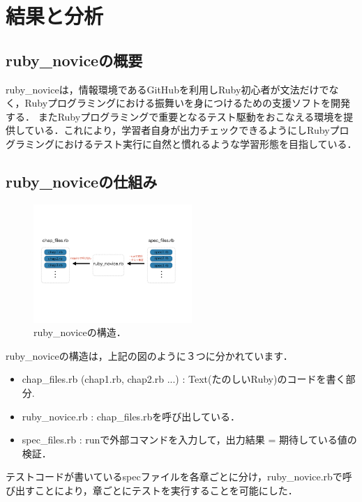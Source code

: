 \section{結果と分析}
\subsection{ruby\_noviceの概要}
ruby\_noviceは，情報環境であるGitHubを利用しRuby初心者が文法だけでなく，Rubyプログラミングにおける振舞いを身につけるための支援ソフトを開発する．
またRubyプログラミングで重要となるテスト駆動をおこなえる環境を提供している．これにより，学習者自身が出力チェックできるようにしRubyプログラミングにおけるテスト実行に自然と慣れるような学習形態を目指している．

\subsection{ruby\_noviceの仕組み}
\begin{figure}[htbp]\begin{center}
\includegraphics[width=6cm,bb=0 0 442 500]{../figs/./ruby_novice.001.jpg}
\caption{ruby\_noviceの構造．}
\label{default}\end{center}\end{figure}
ruby\_noviceの構造は，上記の図のように３つに分かれています．

\begin{itemize}
\item chap\_files.rb (chap1.rb, chap2.rb ...) : Text(たのしいRuby)のコードを書く部分.
\item ruby\_novice.rb :  chap\_files.rbを呼び出している．
\item spec\_files.rb  :  runで外部コマンドを入力して，出力結果 = 期待している値の検証．
\end{itemize}
テストコードが書いているspecファイルを各章ごとに分け，ruby\_novice.rbで呼び出すことにより，章ごとにテストを実行することを可能にした．

